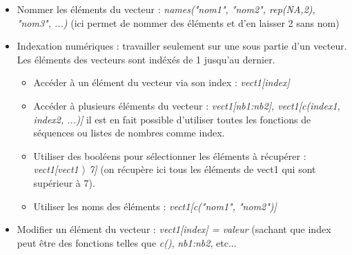 \documentclass[12pt,a4paper]{article}
\begin{document}
\begin{itemize}
\item Nommer les éléments du vecteur : 
\newline \textit{names("nom1", "nom2", rep(NA,2), "nom3", ...)} (ici permet de nommer des éléments et d'en laisser 2 sans nom)
\item Indexation numériques : travailler seulement sur une sous partie d'un vecteur. Les éléments des vecteurs sont indéxés de 1 jusqu'au dernier.
\begin{itemize}
\item Accéder à un élément du vecteur via son index : \textit{vect1[index]}
\item Accéder à plusieurs éléments du vecteur : 
\newline \textit{vect1[nb1:nb2], vect1[c(index1, index2, ...)]} il est en fait possible d'utiliser toutes les fonctions de séquences ou listes de nombres comme index.
\item Utiliser des booléens pour sélectionner les éléments à récupérer :
\newline \textit{vect1[vect1 $\rangle$ 7]} (on récupère ici tous les éléments de vect1 qui sont supérieur à 7).
\item Utiliser les noms des éléments : \textit{vect1[c("nom1", "nom2")]}
\end{itemize}
\item Modifier un élément du vecteur : \textit{vect1[index] = valeur} (sachant que index peut être des fonctions telles que \textit{c()}, \textit{nb1:nb2}, etc...
\end{itemize}
\end{document}
